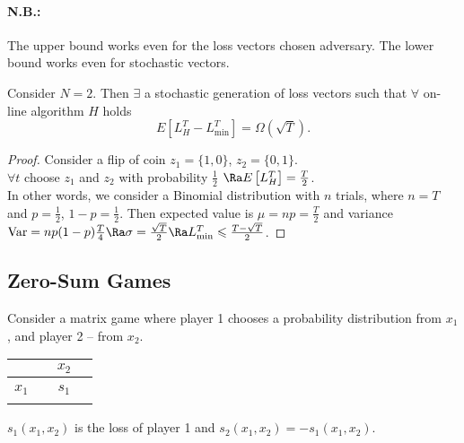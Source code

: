 \paragraph{N.B.:} The upper bound works even for the loss vectors chosen adversary. The lower bound works even for stochastic vectors.
\begin{theorem}
Consider $N=2$. Then $\exists$ a stochastic generation of loss vectors such that $\forall$ on-line algorithm $H$ holds
$$
E\left[L^T_H-L^T_{\min}\right]=\Omega(\sqrt{T}).
$$
\end{theorem}
\begin{proof}
Consider a flip of coin $z_1=\{1,0\}$, $z_2=\{0,1\}$.\\
$\forall t$ choose $z_1$ and $z_2$ with probability $\frac{1}{2}$ $\Ra E\left[L^T_H\right]=\frac{T}{2}$.\\
In other words, we consider a Binomial distribution with $n$ trials, where $n=T$ and $p=\frac{1}{2}$, $1-p=\frac{1}{2}$. Then expected value is $\mu=np=\frac{T}{2}$ and variance $\text{Var}=np(1-p)\frac{T}{4}\Ra\sigma=\frac{\sqrt{T}}{2}\Ra L^T_{\min}\leqslant\frac{T-\sqrt{T}}{2}$.
\end{proof}
\subsection{Zero-Sum Games}
Consider a matrix game where player 1 chooses a probability distribution from $x_1$, and player 2 -- from $x_2$.\\
\begin{tabular}{c|ccc|}
& & $x_2$ &\\
\hline
& & &\\
\hline
$x_1$ & & $s_1$ &\\
\hline
& & &\\
\hline
\end{tabular}
$s_1(x_1,x_2)$ is the loss of player 1 and $s_2(x_1,x_2)=-s_1(x_1,x_2)$.\\


